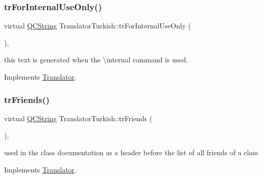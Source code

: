 \mbox{\label{class_translator_turkish_a3ae480e419e3eb06549f67c5f2d28acb}} 
\subsubsection{\texorpdfstring{trForInternalUseOnly()}{trForInternalUseOnly()}}
{\footnotesize\ttfamily virtual \mbox{\hyperlink{class_q_c_string}{Q\+C\+String}} Translator\+Turkish\+::tr\+For\+Internal\+Use\+Only (\begin{DoxyParamCaption}{ }\end{DoxyParamCaption})\hspace{0.3cm}{\ttfamily [inline]}, {\ttfamily [virtual]}}

this text is generated when the \textbackslash{}internal command is used. 

Implements \mbox{\hyperlink{class_translator}{Translator}}.

\mbox{\label{class_translator_turkish_a8a1909a14b72b162a027c36bce09dea6}} 
\subsubsection{\texorpdfstring{trFriends()}{trFriends()}}
{\footnotesize\ttfamily virtual \mbox{\hyperlink{class_q_c_string}{Q\+C\+String}} Translator\+Turkish\+::tr\+Friends (\begin{DoxyParamCaption}{ }\end{DoxyParamCaption})\hspace{0.3cm}{\ttfamily [inline]}, {\ttfamily [virtual]}}

used in the class documentation as a header before the list of all friends of a class 

Implements \mbox{\hyperlink{class_translator}{Translator}}.

\mbox{\label{class_translator_turkish_a28bfc1aa41d4a7347b9f3de10ae3917e}} 
